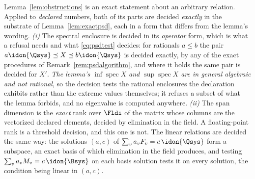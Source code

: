 
\begin{remark}\label{rem:obstructiondecide}
Lemma~\ref{lem:obstructions} is an exact statement about an arbitrary
relation. Applied to \emph{declared} numbers, both of its parts are decided
\emph{exactly} in the substrate of Lemma~\ref{lem:exactpsd}, each in a form
that differs from the lemma's wording.
\emph{(i)} The spectral enclosure is decided in its \emph{operator} form,
which is what a refusal needs and what \eqref{eq:psdtest} decides: for
rationals $a\le b$ the pair $a\idon{\Qsys}\preceq X\preceq b\idon{\Qsys}$ is
decided exactly, by any of the exact procedures of
Remark~\ref{rem:psdalgorithm}, and where it holds the same pair is decided
for $X'$. \emph{The lemma's $\inf\operatorname{spec}X$ and
$\sup\operatorname{spec}X$ are in general algebraic and not rational}, so the
decision tests the rational enclosures the declaration exhibits rather than
the extreme values themselves; it refuses a subset of what the lemma forbids,
and no eigenvalue is computed anywhere.
\emph{(ii)} The span dimension is the \emph{exact} rank over $\Fldi$ of the
matrix whose columns are the vectorized declared elements, decided by
elimination in the field. A floating-point rank is a threshold decision, and
this one is not. The linear relations are decided the same way: the
solutions $(a,c)$ of $\sum_va_vF_v=c\,\idon{\Qsys}$ form a subspace, an exact
basis of which elimination in the field produces, and testing
$\sum_va_vM_v=c\,\idon{\Bsys}$ on each basis solution tests it on every
solution, the condition being linear in $(a,c)$.


\end{remark}
